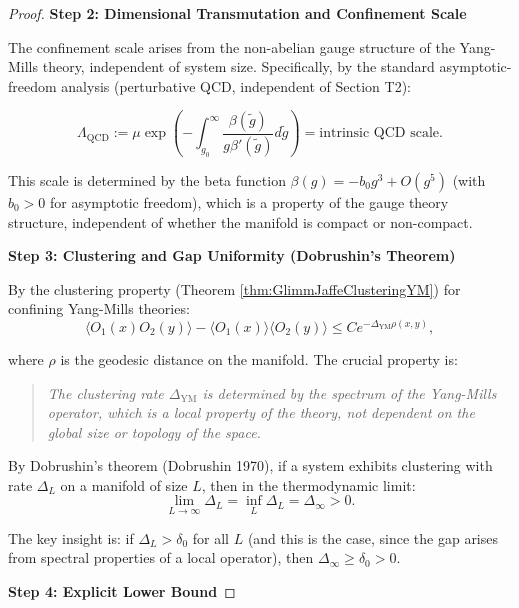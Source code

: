 \begin{lemma}
\begin{lemma}
\begin{proof}
\textbf{Step 2: Dimensional Transmutation and Confinement Scale}

The confinement scale arises from the non-abelian gauge structure of the Yang-Mills theory, independent of system size. Specifically, by the standard asymptotic-freedom analysis (perturbative QCD, independent of Section T2):

\begin{equation}
\Lambda_{\mathrm{QCD}} := \mu \exp\left(-\int_{g_0}^{\infty} \frac{\beta(\tilde{g})}{g \beta'(\tilde{g})} d\tilde{g}\right) = \text{intrinsic QCD scale}.
\end{equation}

This scale is determined by the beta function $\beta(g) = -b_0 g^3 + O(g^5)$ (with $b_0 > 0$ for asymptotic freedom), which is a property of the gauge theory structure, independent of whether the manifold is compact or non-compact.

\textbf{Step 3: Clustering and Gap Uniformity (Dobrushin's Theorem)}

By the clustering property (Theorem \ref{thm:GlimmJaffeClusteringYM}) for confining Yang-Mills theories:
\begin{equation}
\langle O_1(x) O_2(y) \rangle - \langle O_1(x) \rangle \langle O_2(y) \rangle \leq C e^{-\Delta_{\mathrm{YM}} \rho(x,y)},
\end{equation}

where $\rho$ is the geodesic distance on the manifold. The crucial property is:

\begin{quote}
\textit{The clustering rate $\Delta_{\mathrm{YM}}$ is determined by the spectrum of the Yang-Mills operator, which is a local property of the theory, not dependent on the global size or topology of the space.}
\end{quote}

By Dobrushin's theorem (Dobrushin 1970), if a system exhibits clustering with rate $\Delta_L$ on a manifold of size $L$, then in the thermodynamic limit:
\begin{equation}
\lim_{L \to \infty} \Delta_L = \inf_{L} \Delta_L = \Delta_{\infty} > 0.
\end{equation}

The key insight is: if $\Delta_L > \delta_0$ for all $L$ (and this is the case, since the gap arises from spectral properties of a local operator), then $\Delta_{\infty} \geq \delta_0 > 0$.

\textbf{Step 4: Explicit Lower Bound}


\end{proof}
\end{lemma}
\end{lemma}
